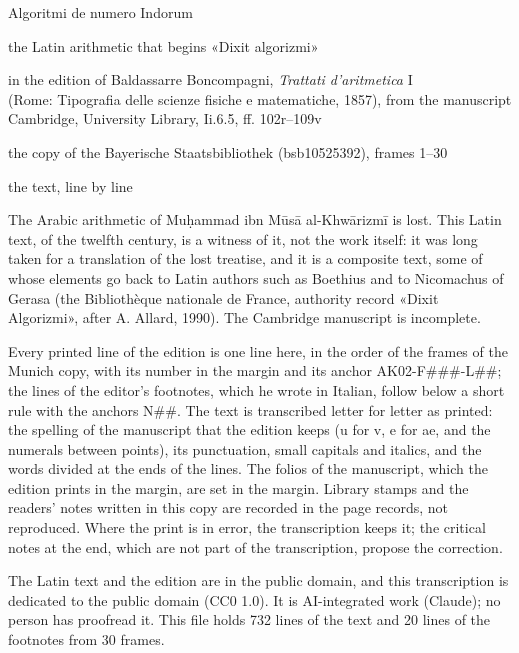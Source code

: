 \documentclass[11pt]{article}
\begin{document}
\thispagestyle{empty}
\begin{center}\LARGE Algoritmi de numero Indorum\par\vspace{4mm}\large the Latin arithmetic that begins «Dixit algorizmi»\par\vspace{5mm}\normalsize in the edition of Baldassarre Boncompagni, \textit{Trattati d’aritmetica} I\\(Rome: Tipografia delle scienze fisiche e matematiche, 1857), from the manuscript\\Cambridge, University Library, Ii.6.5, ff. 102r–109v\par\vspace{3mm}the copy of the Bayerische Staatsbibliothek (bsb10525392), frames 1–30\par\vspace{4mm}\large the text, line by line\end{center}\vspace{6mm}
\noindent The Arabic arithmetic of Muḥammad ibn Mūsā al-Khwārizmī is lost. This Latin text, of the twelfth century, is a witness of it, not the work itself: it was long taken for a translation of the lost treatise, and it is a composite text, some of whose elements go back to Latin authors such as Boethius and to Nicomachus of Gerasa (the Bibliothèque nationale de France, authority record «Dixit Algorizmi», after A. Allard, 1990). The Cambridge manuscript is incomplete.
\par\smallskip\noindent Every printed line of the edition is one line here, in the order of the frames of the Munich copy, with its number in the margin and its anchor AK02-F\#\#\#-L\#\#; the lines of the editor’s footnotes, which he wrote in Italian, follow below a short rule with the anchors N\#\#. The text is transcribed letter for letter as printed: the spelling of the manuscript that the edition keeps (u for v, e for ae, and the numerals between points), its punctuation, small capitals and italics, and the words divided at the ends of the lines. The folios of the manuscript, which the edition prints in the margin, are set in the margin. Library stamps and the readers’ notes written in this copy are recorded in the page records, not reproduced. Where the print is in error, the transcription keeps it; the critical notes at the end, which are not part of the transcription, propose the correction.
\par\smallskip\noindent The Latin text and the edition are in the public domain, and this transcription is dedicated to the public domain (CC0 1.0). It is AI-integrated work (Claude); no person has proofread it. This file holds 732 lines of the text and 20 lines of the footnotes from 30 frames.\par\clearpage
\end{document}
